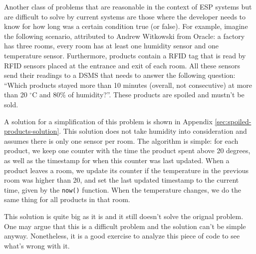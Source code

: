 \documentclass{report}
\begin{document}

Another class of problems that are reasonable in the context of ESP
systems but are difficult to solve by current systems are those where
the developer needs to know for how long was a certain condition true
(or false). For example, imagine the following scenario, attributed to
Andrew Witkowski from Oracle: a factory has three rooms, every room
has at least one humidity sensor and one temperature
sensor. Furthermore, products contain a RFID tag that is read by RFID
sensors placed at the entrance and exit of each room. All these
sensors send their readings to a DSMS that needs to answer the
following question: ``Which products stayed more than 10 minutes
(overall, not consecutive) at more than 20 $^{\circ}$C and 80\% of
humidity?''. These products are spoiled and mustn't be sold.

A solution for a simplification of this problem is shown in Appendix
\ref{sec:spoiled-products-solution}. This solution does not take
humidity into consideration and assumes there is only one sensor per
room. The algorithm is simple: for each product, we keep one counter
with the time the product spent above 20 degrees, as well as the
timestamp for when this counter was last updated. When a product
leaves a room, we update its counter if the temperature in the
previous room was higher than 20, and set the last updated timestamp
to the current time, given by the \verb=now()= function. When the
temperature changes, we do the same thing for all products in that
room.

This solution is quite big as it is and it still doesn't solve the
orignal problem. One may argue that this is a difficult problem and
the solution can't be simple anyway. Nonetheless, it is a good
exercise to analyze this piece of code to see what's wrong with it.
\end{document}
